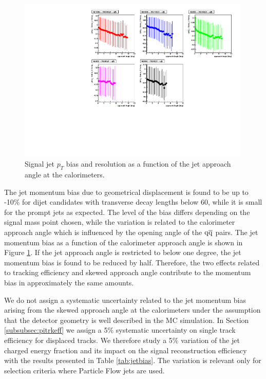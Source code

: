 \begin{figure}[htbp]
\centering
\includegraphics[width=0.99\textwidth]{plots/signal/biasapproachAngle.pdf}
\caption{Signal jet $p_T$ bias and resolution as a function of the jet approach angle at the calorimeters.\label{fig:jetbiasAngle}}
\end{figure} 

The jet momentum bias due to geometrical displacement is found to be up to -10\% for dijet candidates with transverse
decay lengths below 60\cm, while it is small for the prompt jets as expected. The level of the bias differs
depending on the signal mass point chosen, while the variation is related to the calorimeter approach angle
which is influenced by the opening angle of the $\mathrm{q}\overline{\mathrm{q}}$ pairs.
The jet momentum bias as a function of the calorimeter approach angle is shown in Figure \ref{fig:jetbiasAngle}.
If the jet approach angle is restricted to below one degree, the jet momentum bias is found to be reduced by half.
 Therefore, the two effects related to tracking efficiency and skewed approach angle contribute to the 
momentum bias in approximately the same amounts.

We do not assign a systematic uncertainty related to the jet momentum bias arising from the skewed approach angle 
at the calorimeters under the assumption that the detector geometry is well described in the MC simulation.
In Section \ref{subsubsec:pitrkeff} we assign a 5\% systematic uncertainty on single track efficiency for 
displaced tracks. We therefore study a 5\% variation of the jet charged energy
fraction and its impact on the signal reconstruction efficiency with the results presented 
in Table \ref{tab:jetbias}. The variation is relevant only for selection criteria where Particle Flow jets
are used. 

